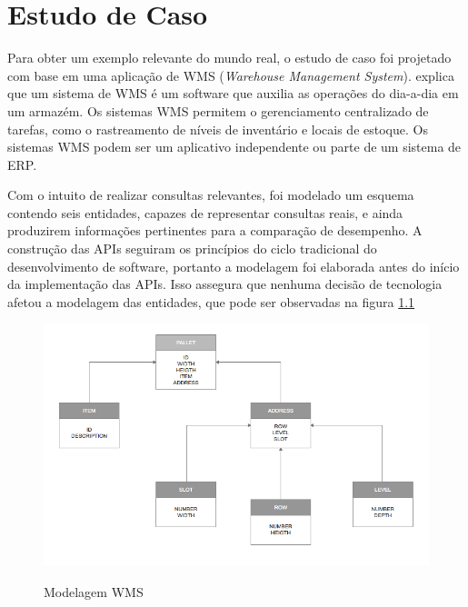 \chapter[Estudo de Caso]{Estudo de Caso}

Para obter um exemplo relevante do mundo real, o estudo de caso foi projetado com base em uma aplicação de WMS (\textit{Warehouse Management System}).  explica que um sistema de WMS é um software que auxilia as operações do dia-a-dia em um armazém. Os sistemas WMS permitem o gerenciamento centralizado de tarefas, como o rastreamento de níveis de inventário e locais de estoque. Os sistemas WMS podem ser  um aplicativo independente ou parte de um sistema de ERP.

Com o intuito de realizar consultas relevantes, foi modelado um esquema contendo seis entidades, capazes de representar consultas reais, e ainda produzirem informações pertinentes para a comparação de desempenho. A construção das APIs seguiram os princípios do ciclo tradicional do desenvolvimento de software, portanto a modelagem foi elaborada antes do início da implementação das APIs. Isso assegura que nenhuma decisão de tecnologia afetou a modelagem das entidades, que pode ser observadas na figura \ref{fig:wms-model}

\begin{figure}[htbp]
\centering
\includegraphics[width=1\textwidth]{figuras/model.png}
\label{fig:wms-model}
\caption{Modelagem WMS}
\author{fonte: Autor}
\end{figure}

